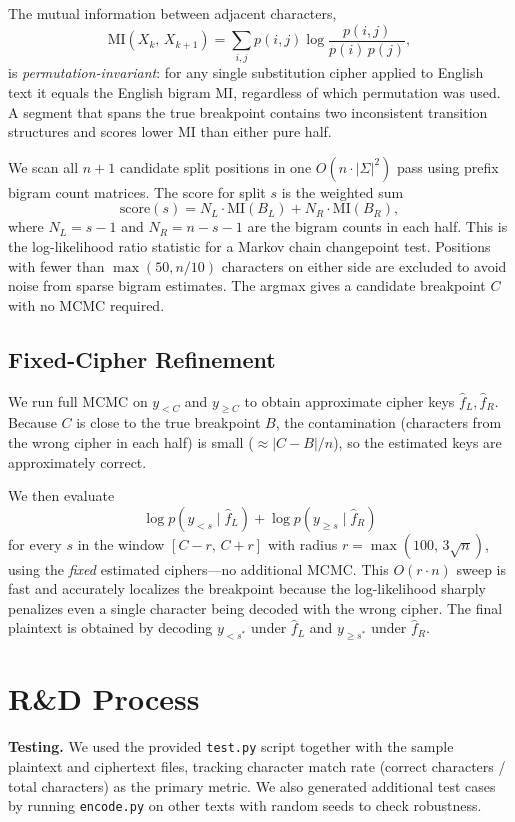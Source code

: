 \documentclass[12pt]{article}
\begin{document}
The mutual information between adjacent characters,
\[
  \mathrm{MI}(X_k,\, X_{k+1})
  = \sum_{i,j} p(i,j)\log\frac{p(i,j)}{p(i)\,p(j)},
\]
is \emph{permutation-invariant}: for any single substitution cipher applied to
English text it equals the English bigram MI, regardless of which permutation
was used.  A segment that spans the true breakpoint contains two inconsistent
transition structures and scores lower MI than either pure half.

We scan all $n+1$ candidate split positions in one $O(n\cdot|\Sigma|^2)$ pass
using prefix bigram count matrices.  The score for split $s$ is the weighted
sum
\[
  \mathrm{score}(s)
  = N_L\cdot\mathrm{MI}(B_L) + N_R\cdot\mathrm{MI}(B_R),
\]
where $N_L=s-1$ and $N_R=n-s-1$ are the bigram counts in each half.  This is
the log-likelihood ratio statistic for a Markov chain changepoint test.
Positions with fewer than $\max(50, n/10)$ characters on either side are
excluded to avoid noise from sparse bigram estimates.  The argmax gives a
candidate breakpoint $C$ with no MCMC required.

\subsection{Fixed-Cipher Refinement}

We run full MCMC on $y_{<C}$ and $y_{\geq C}$ to obtain approximate cipher
keys $\hat f_L,\hat f_R$.  Because $C$ is close to the true breakpoint $B$,
the contamination (characters from the wrong cipher in each half) is small
($\approx|C-B|/n$), so the estimated keys are approximately correct.

We then evaluate
\[
  \log p(y_{<s}\mid\hat f_L)+\log p(y_{\geq s}\mid\hat f_R)
\]
for every $s$ in the window $[C-r,\, C+r]$ with radius
$r=\max(100,\,3\sqrt{n})$, using the \emph{fixed} estimated ciphers---no
additional MCMC.  This $O(r\cdot n)$ sweep is fast and accurately localizes
the breakpoint because the log-likelihood sharply penalizes even a single
character being decoded with the wrong cipher.  The final plaintext is obtained
by decoding $y_{<s^*}$ under $\hat f_L$ and $y_{\geq s^*}$ under $\hat f_R$.

\section{R\&D Process}

\textbf{Testing.} We used the provided \texttt{test.py} script together with
the sample plaintext and ciphertext files, tracking character match rate
(correct characters / total characters) as the primary metric.  We also
generated additional test cases by running \texttt{encode.py} on other texts
with random seeds to check robustness.
\end{document}
